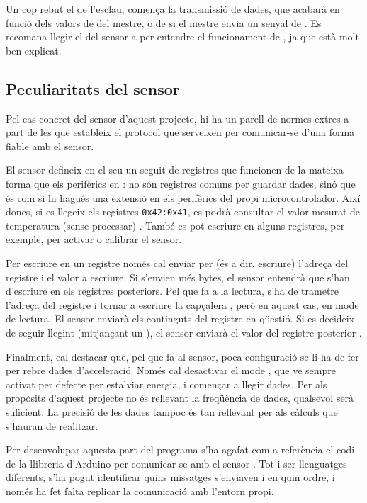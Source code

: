 Un cop rebut el  de l'esclau, comença la transmissió de
dades, que acabarà en funció dels valors de  del mestre, o
de si el mestre envia un senyal de . Es recomana llegir el  del
sensor a \cite{mpu6050specs} per entendre el funcionament de ,
ja que està molt ben explicat.

\subsection{Peculiaritats del sensor }
\label{subsec:i2c_sensor}

Pel cas concret del sensor d'aquest projecte, hi ha un parell de normes extres
a part de les que estableix el protocol  que serveixen per comunicar-se
d'una forma fiable amb el sensor.

El sensor  defineix en el seu  un seguit de
registres que funcionen de la mateixa forma que els perifèrics en :
no són registres comuns per guardar dades, sinó que és com si hi hagués una
extensió en els perifèrics del propi microcontrolador. Així doncs, si es llegeix
els registres \texttt{0x42:0x41}, es podrà consultar el valor mesurat de temperatura
(sense processar) \cite{MPU6050reg}. També es pot escriure en alguns registres,
per exemple, per activar o calibrar el sensor.

Per escriure en un registre només cal enviar per  (és a dir, escriure)
l'adreça del registre i el valor a escriure. Si s'envien més bytes, el sensor
entendrà que s'han d'escriure en els registres posteriors. Pel que fa a la lectura,
s'ha de trametre l'adreça del registre i tornar a escriure la capçalera ,
però en aquest cas, en mode de lectura. El sensor enviarà els continguts del
registre en qüestió. Si es decideix de seguir llegint (mitjançant un ),
el sensor enviarà el valor del registre posterior \cite{mpu6050specs}.

Finalment, cal destacar que, pel que fa al sensor, poca configuració se li ha de
fer per rebre dades d'acceleració. Només cal desactivar el mode ,
que ve sempre activat per defecte per estalviar energia, i començar a llegir
dades. Per als propòsits d'aquest projecte no és rellevant la freqüència de
dades, qualsevol serà suficient. La precisió de les dades tampoc és tan rellevant
per als càlculs que s'hauran de realitzar.

Per desenvolupar aquesta part del programa s'ha agafat com a referència el
codi de la llibreria d'Arduino per comunicar-se amb el sensor
\cite{mpu6050ino}. Tot i ser llenguatges diferents, s'ha pogut identificar
quins missatges  s'enviaven i en quin ordre, i només ha fet falta
replicar la comunicació amb l'entorn propi.

